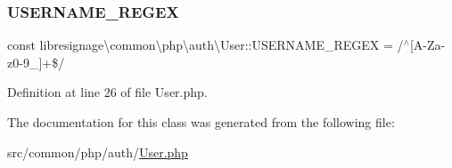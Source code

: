 \subsubsection{\texorpdfstring{U\+S\+E\+R\+N\+A\+M\+E\+\_\+\+R\+E\+G\+EX}{USERNAME\_REGEX}}
{\footnotesize\ttfamily const libresignage\textbackslash{}common\textbackslash{}php\textbackslash{}auth\textbackslash{}\+User\+::\+U\+S\+E\+R\+N\+A\+M\+E\+\_\+\+R\+E\+G\+EX = \textquotesingle{}/$^\wedge$\mbox{[}A-\/Za-\/z0-\/9\+\_\+\mbox{]}+\$/\textquotesingle{}}



Definition at line 26 of file User.\+php.



The documentation for this class was generated from the following file\+:\begin{DoxyCompactItemize}
\item 
src/common/php/auth/\hyperlink{User_8php}{User.\+php}\end{DoxyCompactItemize}
